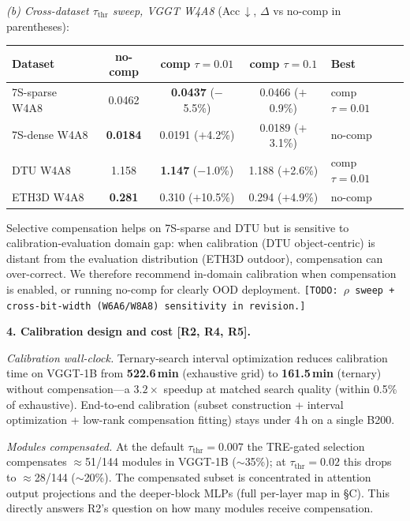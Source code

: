 \documentclass[9pt]{article}
\begin{document}
\smallskip
\noindent\emph{(b) Cross-dataset $\tau_\text{thr}$ sweep, VGGT W4A8} (Acc\,$\downarrow$, $\Delta$ vs no-comp in parentheses):

\begin{center}\small
\begin{tabular}{lcccl}
\toprule
Dataset         & no-comp          & comp $\tau{=}0.01$            & comp $\tau{=}0.1$               & Best        \\
\midrule
7S-sparse W4A8  & 0.0462           & \textbf{0.0437} ($-$5.5\%)    & 0.0466 ($+$0.9\%)               & comp $\tau{=}0.01$ \\
7S-dense  W4A8  & \textbf{0.0184}  & 0.0191 ($+$4.2\%)             & 0.0189 ($+$3.1\%)               & no-comp     \\
DTU       W4A8  & 1.158            & \textbf{1.147} ($-$1.0\%)     & 1.188 ($+$2.6\%)                & comp $\tau{=}0.01$ \\
ETH3D     W4A8  & \textbf{0.281}   & 0.310 ($+$10.5\%)             & 0.294 ($+$4.9\%)                & no-comp     \\
\bottomrule
\end{tabular}
\end{center}

Selective compensation helps on 7S-sparse and DTU but is sensitive to calibration-evaluation domain gap: when calibration (DTU object-centric) is distant from the evaluation distribution (ETH3D outdoor), compensation can over-correct. We therefore recommend in-domain calibration when compensation is enabled, or running no-comp for clearly OOD deployment. \texttt{[TODO: $\rho$ sweep + cross-bit-width (W6A6/W8A8) sensitivity in revision.]}

\smallskip
\noindent\textbf{4. Calibration design and cost [R2, R4, R5].}

\noindent\emph{Calibration wall-clock.} Ternary-search interval optimization reduces calibration time on VGGT-1B from \textbf{522.6\,min} (exhaustive grid) to \textbf{161.5\,min} (ternary) without compensation---a $3.2\times$ speedup at matched search quality (within 0.5\% of exhaustive). End-to-end calibration (subset construction + interval optimization + low-rank compensation fitting) stays under 4\,h on a single B200.

\noindent\emph{Modules compensated.} At the default $\tau_\text{thr}{=}0.007$ the TRE-gated selection compensates $\approx$51/144 modules in VGGT-1B ($\sim$35\%); at $\tau_\text{thr}{=}0.02$ this drops to $\approx$28/144 ($\sim$20\%). The compensated subset is concentrated in attention output projections and the deeper-block MLPs (full per-layer map in \S C). This directly answers R2's question on how many modules receive compensation.
\end{document}
